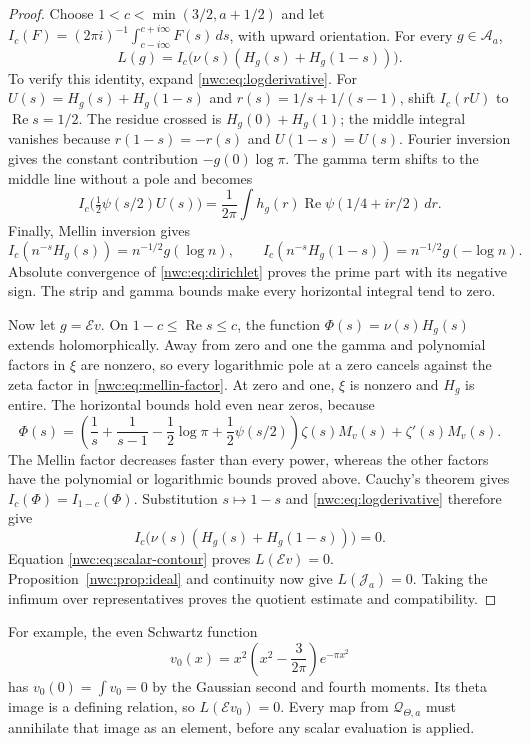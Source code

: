\begin{proof}
Choose $1<c<\min(3/2,a+1/2)$ and let
$I_c(F)=(2\pi i)^{-1}\int_{c-i\infty}^{c+i\infty}F(s)\,ds$,
with upward orientation. For every $g\in\mathcal A_a$,
\begin{equation}\label{nwc:eq:scalar-contour}
 L(g)=I_c\bigl(\nu(s)(H_g(s)+H_g(1-s))\bigr).
\end{equation}
To verify this identity, expand \eqref{nwc:eq:logderivative}.
For $U(s)=H_g(s)+H_g(1-s)$ and $r(s)=1/s+1/(s-1)$,
shift $I_c(rU)$ to $\operatorname{Re}s=1/2$.
The residue crossed is $H_g(0)+H_g(1)$; the middle integral vanishes
because $r(1-s)=-r(s)$ and $U(1-s)=U(s)$.
Fourier inversion gives the constant contribution $-g(0)\log\pi$.
The gamma term shifts to the middle line without a pole and becomes
\[
 I_c\bigl(\tfrac12\psi(s/2)U(s)\bigr)
 =\frac1{2\pi}\int h_g(r)\operatorname{Re}\psi(1/4+ir/2)\,dr.
\]
Finally, Mellin inversion gives
\[
 I_c(n^{-s}H_g(s))=n^{-1/2}g(\log n),\qquad
 I_c(n^{-s}H_g(1-s))=n^{-1/2}g(-\log n).
\]
Absolute convergence of \eqref{nwc:eq:dirichlet} proves the prime
part with its negative sign. The strip and gamma bounds make every
horizontal integral tend to zero.

Now let $g=\mathcal Ev$. On $1-c\leq\operatorname{Re}s\leq c$,
the function $\Phi(s)=\nu(s)H_g(s)$ extends holomorphically.
Away from zero and one the gamma and polynomial factors in $\xi$
are nonzero, so every logarithmic pole at a zero cancels against
the zeta factor in \eqref{nwc:eq:mellin-factor}.
At zero and one, $\xi$ is nonzero and $H_g$ is entire.
The horizontal bounds hold even near zeros, because
\[
 \Phi(s)=
 \left(\frac1s+\frac1{s-1}-\frac12\log\pi
                       +\frac12\psi(s/2)\right)\zeta(s)M_v(s)
       +\zeta'(s)M_v(s).
\]
The Mellin factor decreases faster than every power, whereas the
other factors have the polynomial or logarithmic bounds proved above.
Cauchy's theorem gives $I_c(\Phi)=I_{1-c}(\Phi)$.
Substitution $s\mapsto1-s$ and \eqref{nwc:eq:logderivative} therefore give
\[
 I_c\bigl(\nu(s)(H_g(s)+H_g(1-s))\bigr)=0.
\]
Equation \eqref{nwc:eq:scalar-contour} proves $L(\mathcal Ev)=0$.
Proposition~\ref{nwc:prop:ideal} and continuity now give
$L(\mathcal J_a)=0$. Taking the infimum over representatives proves
the quotient estimate and compatibility.
\end{proof}

For example, the even Schwartz function
\[
 v_0(x)=x^2\left(x^2-\frac3{2\pi}\right)e^{-\pi x^2}
\]
has $v_0(0)=\int v_0=0$ by the Gaussian second and fourth moments.
Its theta image is a defining relation, so $L(\mathcal Ev_0)=0$.
Every map from $\mathcal Q_{\Theta,a}$ must annihilate that image
as an element, before any scalar evaluation is applied.

